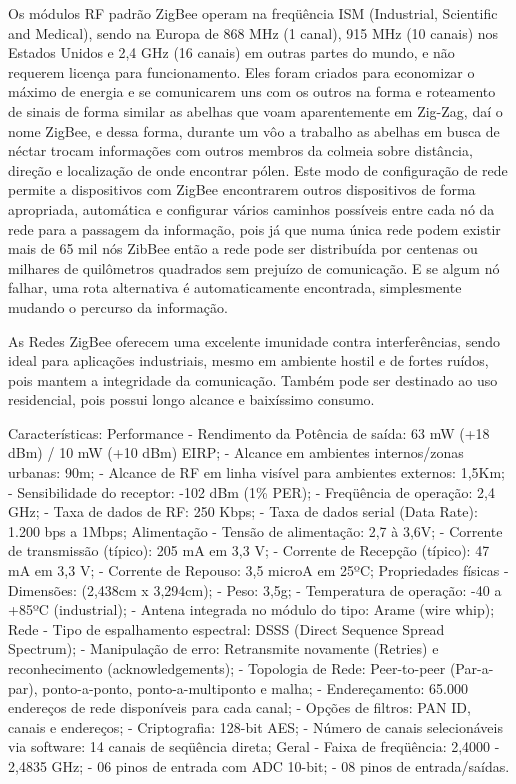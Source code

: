 Os módulos RF padrão ZigBee operam na freqüência ISM (Industrial, Scientific and Medical), sendo na Europa de 868 MHz (1 canal), 915 MHz (10 canais) nos Estados Unidos e 2,4 GHz (16 canais) em outras partes do mundo, e não requerem licença para funcionamento. Eles foram criados para economizar o máximo de energia e se comunicarem uns com os outros na forma e roteamento de sinais de forma similar as abelhas que voam aparentemente em Zig-Zag, daí o nome ZigBee, e dessa forma, durante um vôo a trabalho as abelhas em busca de néctar trocam informações com outros membros da colmeia sobre distância, direção e localização de onde encontrar pólen. Este modo de configuração de rede permite a dispositivos com ZigBee encontrarem outros dispositivos de forma apropriada, automática e configurar vários caminhos possíveis entre cada nó da rede para a passagem da informação, pois já que numa única rede podem existir mais de 65 mil nós ZibBee então a rede pode ser distribuída por centenas ou milhares de quilômetros quadrados sem prejuízo de comunicação. E se algum nó falhar, uma rota alternativa é automaticamente encontrada, simplesmente mudando o percurso da informação.



As Redes ZigBee oferecem uma excelente imunidade contra interferências, sendo ideal para aplicações industriais, mesmo em ambiente hostil e de fortes ruídos, pois mantem a integridade da comunicação. Também pode ser destinado ao uso residencial, pois possui longo alcance e baixíssimo consumo.


Características:
Performance
- Rendimento da Potência de saída: 63 mW (+18 dBm) / 10 mW (+10 dBm) EIRP;
- Alcance em ambientes internos/zonas urbanas: 90m;
- Alcance de RF em linha visível para ambientes externos: 1,5Km;
- Sensibilidade do receptor: -102 dBm (1\% PER);
- Freqüência de operação: 2,4 GHz;
- Taxa de dados de RF: 250 Kbps;
- Taxa de dados serial (Data Rate): 1.200 bps a 1Mbps;
Alimentação
- Tensão de alimentação: 2,7 à 3,6V;
- Corrente de transmissão (típico): 205 mA em 3,3 V;
- Corrente de Recepção (típico): 47 mA em 3,3 V;
- Corrente de Repouso: 3,5 microA em 25ºC;
Propriedades físicas
- Dimensões: (2,438cm x 3,294cm);
- Peso: 3,5g;
- Temperatura de operação: -40 a +85ºC (industrial);
- Antena integrada no módulo do tipo: Arame (wire whip);
Rede
- Tipo de espalhamento espectral: DSSS (Direct Sequence Spread Spectrum);
- Manipulação de erro: Retransmite novamente (Retries) e reconhecimento (acknowledgements);
- Topologia de Rede: Peer-to-peer (Par-a-par), ponto-a-ponto, ponto-a-multiponto e malha;
- Endereçamento: 65.000 endereços de rede disponíveis para cada canal;
- Opções de filtros: PAN ID, canais e endereços;
- Criptografia: 128-bit AES;
- Número de canais selecionáveis via software: 14 canais de seqüência direta;
Geral
- Faixa de freqüência: 2,4000 - 2,4835 GHz;
- 06 pinos de entrada com ADC 10-bit;
- 08 pinos de entrada/saídas.

